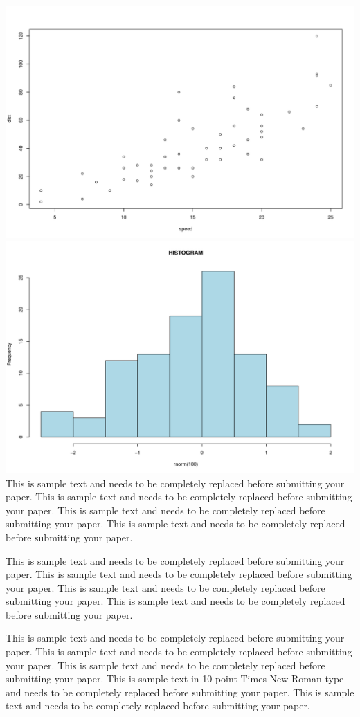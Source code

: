 \documentclass[]{asaproc}
\begin{document}
\includegraphics{./Figs/unnamed-chunk-1-1.pdf}
\includegraphics{./Figs/unnamed-chunk-1-2.pdf} This is sample text and
needs to be completely replaced before submitting your paper. This is
sample text and needs to be completely replaced before submitting your
paper. This is sample text and needs to be completely replaced before
submitting your paper. This is sample text and needs to be completely
replaced before submitting your paper.

This is sample text and needs to be completely replaced before
submitting your paper. This is sample text and needs to be completely
replaced before submitting your paper. This is sample text and needs to
be completely replaced before submitting your paper. This is sample text
and needs to be completely replaced before submitting your paper.

This is sample text and needs to be completely replaced before
submitting your paper. This is sample text and needs to be completely
replaced before submitting your paper. This is sample text and needs to
be completely replaced before submitting your paper. This is sample text
in 10-point Times New Roman type and needs to be completely replaced
before submitting your paper. This is sample text and needs to be
completely replaced before submitting your paper.
\end{document}
